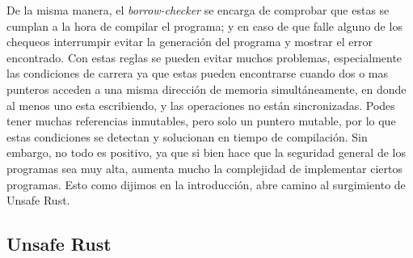 De la misma manera, el \textit{borrow-checker} se encarga de comprobar que estas se cumplan a la hora de compilar el programa; y en caso de que falle alguno de los chequeos interrumpir evitar la generación del programa y mostrar el error encontrado. Con estas reglas se pueden evitar muchos problemas, especialmente las condiciones de carrera ya que estas pueden encontrarse cuando dos o mas punteros acceden a una misma dirección de memoria simultáneamente, en donde al menos uno esta escribiendo, y las operaciones no están sincronizadas. Podes tener muchas referencias inmutables, pero solo un puntero mutable, por lo que estas condiciones se detectan y solucionan en tiempo de compilación.
Sin embargo, no todo es positivo, ya que si bien hace que la seguridad general de los programas sea muy alta, aumenta mucho la complejidad de implementar ciertos programas. Esto como dijimos en la introducción, abre camino al surgimiento de Unsafe Rust.

\subsection{Unsafe Rust}

